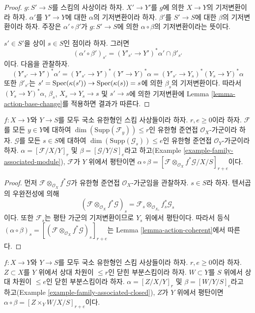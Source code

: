 \begin{proof}
$g : S' \to S$를 스킴의 사상이라 하자. $X' \to Y'$를 $g$에 의한
$X \to Y$의 기저변환이라 하자. $\alpha'$를 $Y' \to Y$에 대한
$\alpha$의 기저변환이라 하자. $\beta'$를 $S' \to S$에 대한
$\beta$의 기저변환이라 하자. 주장은 $\alpha' \circ \beta'$가
$g : S' \to S$에 의한 $\alpha \circ \beta$의 기저변환이라는 뜻이다.

\medskip\noindent
$s' \in S'$을 상이 $s \in S$인 점이라 하자. 그러면
$$
(\alpha' \circ \beta')_{s'} = (Y'_{s'} \to Y')^*\alpha' \cap \beta'_{s'}
$$
이다. 다음을 관찰하자.
$$
(Y'_{s'} \to Y')^*\alpha' =
(Y'_{s'} \to Y')^*(Y' \to Y)^*\alpha =
(Y'_{s'} \to Y_s)^*(Y_s \to Y)^*\alpha
$$
또한 $\beta'_{s'}$는
$s' = \mathop{\mathrm{Spec}}(\kappa(s')) \to \mathop{\mathrm{Spec}}(\kappa(s)) = s$에 의한
$\beta_s$의 기저변환이다. 따라서 $(Y_s \to Y)^*\alpha$,
$\beta_s$, $X_s \to Y_s \to s$ 및 $s' \to s$에 의한 기저변환에
Lemma \ref{lemma-action-base-change}를 적용하면 결과가 따른다.
\end{proof}

\begin{lemma}
\label{lemma-construction-coherent}
$f : X \to Y$와 $Y \to S$를 모두 국소 유한형인 스킴 사상들이라
하자. $r, e \geq 0$이라 하자. $\mathcal{F}$를 모든 $y \in Y$에 대하여
$\dim(\text{Supp}(\mathcal{F}_y)) \leq r$인 유한형 준연접
$\mathcal{O}_X$-가군이라 하자. $\mathcal{G}$를 모든 $s \in S$에 대하여
$\dim(\text{Supp}(\mathcal{G}_s)) \leq e$인 유한형 준연접
$\mathcal{O}_Y$-가군이라 하자. $\alpha = [\mathcal{F}/X/Y]_r$ 및
$\beta = [\mathcal{G}/Y/S]_e$라고 하고(Example
\ref{example-family-associated-module}), $\mathcal{F}$가 $Y$ 위에서
평탄이면
$\alpha \circ \beta =
[\mathcal{F} \otimes_{\mathcal{O}_X} f^*\mathcal{G}/X/S]_{r + e}$이다.
\end{lemma}

\begin{proof}
먼저 $\mathcal{F} \otimes_{\mathcal{O}_X} f^*\mathcal{G}$가 유한형
준연접 $\mathcal{O}_X$-가군임을 관찰하자. $s \in S$라 하자. 텐서곱의
우완전성에 의해
$$
(\mathcal{F} \otimes_{\mathcal{O}_X} f^*\mathcal{G})_s =
\mathcal{F}_s \otimes_{\mathcal{O}_{X_s}} f_s^*\mathcal{G}_s
$$
이다. 또한 $\mathcal{F}_s$는 평탄 가군의 기저변환이므로 $Y_s$ 위에서
평탄이다. 따라서 등식 $(\alpha \circ \beta)_s =
[(\mathcal{F} \otimes_{\mathcal{O}_X} f^*\mathcal{G})_s]_{r + e}$는
Lemma \ref{lemma-action-coherent}에서 따른다.
\end{proof}

\begin{lemma}
\label{lemma-construction-closed}
$f : X \to Y$와 $Y \to S$를 모두 국소 유한형인 스킴 사상들이라
하자. $r, e \geq 0$이라 하자. $Z \subset X$를 $Y$ 위에서 상대 차원이
$\leq r$인 닫힌 부분스킴이라 하자. $W \subset Y$를 $S$ 위에서 상대
차원이 $\leq e$인 닫힌 부분스킴이라 하자. $\alpha = [Z/X/Y]_r$ 및
$\beta = [W/Y/S]_e$라고 하고(Example
\ref{example-family-associated-closed}), $Z$가 $Y$ 위에서 평탄이면
$\alpha \circ \beta = [Z \times_Y W/X/S]_{r + e}$이다.
\end{lemma}

